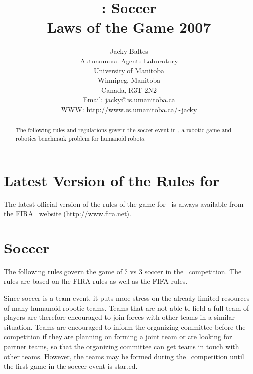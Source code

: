 \documentclass[12pt]{hurocup}
\begin{document}
\title{\HuroCup: Soccer\\
Laws of the Game 2007}

\author{Jacky Baltes\\
Autonomous Agents Laboratory\\
University of Manitoba\\
Winnipeg, Manitoba\\
Canada, R3T 2N2\\
Email: jacky@cs.umanitoba.ca\\
WWW: http://www.cs.umanitoba.ca/\~{ }jacky
}

\maketitle
\begin{abstract}
The following rules and regulations govern the soccer event in
\HuroCup, a robotic game and robotics benchmark problem for humanoid
robots.
%
\end{abstract}

\section*{Latest Version of the Rules for \HuroCup}
\label{sec:updates}

The latest official version of the rules of the game for \HuroCup\ is
always available from the FIRA \HuroCup\ website (http://www.fira.net).

\newpage

\section{Soccer}
\label{sec:soccer}

The following rules govern the game of 3 vs 3 soccer in the \HuroCup\
competition. The rules are based on the FIRA rules as well as the FIFA
rules.

Since soccer is a team event, it puts more stress on the already
limited resources of many humanoid robotic teams. Teams that are not
able to field a full team of players are therefore encouraged to join
forces with other teams in a similar situation. Teams are encouraged
to inform the organizing committee before the competition if they are
planning on forming a joint team or are looking for partner teams, so
that the organizing committee can get teams in touch with other
teams. However, the teams may be formed during the \HuroCup\
competition until the first game in the soccer event is started.
\end{document}
